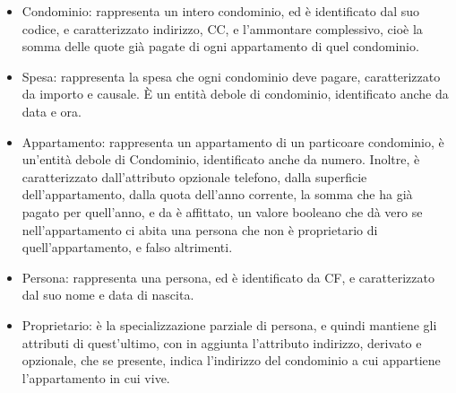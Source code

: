 \begin{itemize}
    \item Condominio: rappresenta un intero condominio, ed è identificato dal suo codice, e caratterizzato indirizzo, CC, 
                      e l'ammontare complessivo, cioè la somma delle quote già pagate di ogni appartamento di quel condominio.
    \item Spesa: rappresenta la spesa che ogni condominio deve pagare, caratterizzato da importo e causale.
                 È un entità debole di condominio, identificato anche da data e ora.
    \item Appartamento: rappresenta un appartamento di un particoare condominio, è un'entità debole di Condominio, identificato anche da numero.
                        Inoltre, è caratterizzato dall'attributo opzionale telefono, dalla superficie dell'appartamento, 
                        dalla quota dell'anno corrente, la somma che ha già pagato per quell'anno, e da è affittato, un valore booleano
                        che dà vero se nell'appartamento ci abita una persona che non è proprietario di quell'appartamento, e falso altrimenti.
    \item Persona: rappresenta una persona, ed è identificato da CF, e caratterizzato dal suo nome e data di nascita.
    \item Proprietario: è la specializzazione parziale di persona, e quindi mantiene gli attributi di quest'ultimo,
                        con in aggiunta l'attributo indirizzo, derivato e opzionale, che se presente,
                        indica l'indirizzo del condominio a cui appartiene l'appartamento in cui vive.                        
\end{itemize}
